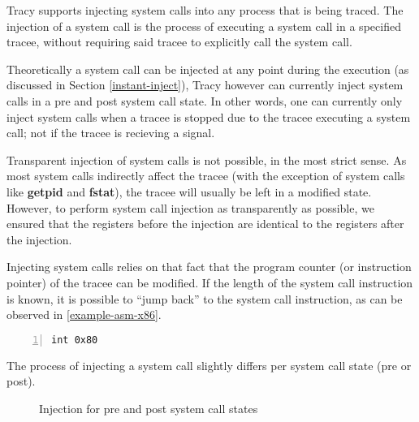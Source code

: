 \documentclass[a4paper, 10pt]{report}
\begin{document}
Tracy supports injecting system calls into any process that is being traced.
The injection of a system call is the process of executing a system call in
a specified tracee, without requiring said tracee to explicitly call the
system call.

Theoretically a system call can be injected at any point during
the execution (as discussed in Section \ref{instant-inject}),
Tracy however can currently inject system calls in a pre and post
system call state. In other words, one can currently only inject system calls
when a tracee is stopped due to the tracee executing a system call; not if
the tracee is recieving a signal.

Transparent injection of system calls is not possible, in the most strict sense.
As most system calls indirectly affect the tracee (with the exception of system
calls like \textbf{getpid} and \textbf{fstat}), the tracee will usually
be left in a modified state. However, to perform system call injection as
transparently as possible, we ensured that the registers before the injection
are identical to the registers after the injection.

Injecting system calls relies on that fact that the program counter (or
instruction pointer) of the tracee can be modified. If the length of the system
call instruction is known, it is possible to ``jump back'' to the system call
instruction, as can be observed in \ref{example-asm-x86}.

\begin{lstlisting}[numbers=left,label=example-asm-x86]
int 0x80
\end{lstlisting}
\lstset{
    language=Python,
    caption=
}

The process of injecting a system call slightly differs per system
call state (pre or post).

\begin{figure}
    \centering
    \hspace{1em}
    \caption{Injection for pre and post system call states}
    \label{fig:injection}
\end{figure}
\end{document}
